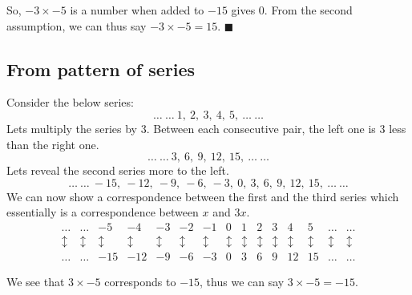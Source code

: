 \documentclass{article}
\begin{document}
So, $-3 \times -5$ is a number when added to $-15$ gives $0$. From the second assumption, we can thus say $-3 \times -5 = 15$. $\blacksquare$

\subsection{From pattern of series}

Consider the below series:
\begin{equation}
	\ldots\ \ldots\ 1,\ 2,\ 3,\ 4,\ 5, \ \ldots\ \ldots
\end{equation}
Lets multiply the series by 3. Between each consecutive pair, the left one is $3$ less than the right one.
\begin{equation}
	\ldots\ \ldots\ 3,\ 6,\ 9,\ 12,\ 15, \ \ldots\ \ldots
\end{equation}
Lets reveal the second series more to the left.
\begin{equation}
	\ldots\ \ldots\ -15,\ -12,\ -9,\ -6,\ -3,\ 0,\ 3,\ 6,\ 9,\ 12,\ 15, \ \ldots\ \ldots
\end{equation}
We can now show a correspondence between the first and the third series which essentially is a correspondence between $x$ and $3x$.
\[
\begin{array}{rrrrrrrrrrrrrrr}
\ldots & \ldots & -5 & -4 & -3 & -2 & -1 & 0 & 1 & 2 & 3 & 4 & 5 & \ldots & \ldots\\
\updownarrow & \updownarrow & \updownarrow & \updownarrow & \updownarrow & \updownarrow & \updownarrow & \updownarrow & \updownarrow & \updownarrow & \updownarrow & \updownarrow & \updownarrow & \updownarrow & \updownarrow\\
\ldots & \ldots & -15 & -12 & -9 & -6 & -3 & 0 & 3 & 6 & 9 & 12 & 15 & \ldots & \ldots
\end{array}
\]

We see that $3 \times -5$ corresponds to $-15$, thus we can say $3 \times -5 = -15$.\\
\end{document}
